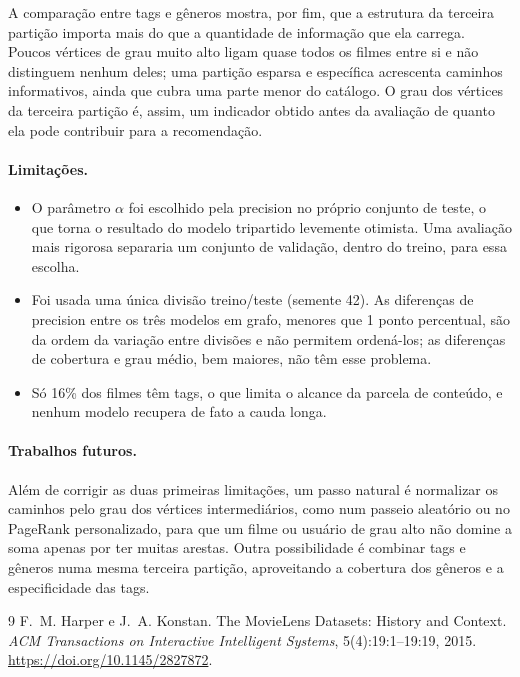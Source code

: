 \documentclass[12pt,a4paper]{article}
\theoremstyle{definition}
\begin{document}
A comparação entre tags e gêneros mostra, por fim, que a estrutura da
terceira partição importa mais do que a quantidade de informação que ela
carrega. Poucos vértices de grau muito alto ligam quase todos os filmes
entre si e não distinguem nenhum deles; uma partição esparsa e
específica acrescenta caminhos informativos, ainda que cubra uma parte
menor do catálogo. O grau dos vértices da terceira partição é, assim, um
indicador obtido antes da avaliação de quanto ela pode contribuir para a
recomendação.

\paragraph{Limitações.}
\begin{itemize}
  \item O parâmetro $\alpha$ foi escolhido pela precision no próprio
        conjunto de teste, o que torna o resultado do modelo tripartido
        levemente otimista. Uma avaliação mais rigorosa separaria um
        conjunto de validação, dentro do treino, para essa escolha.
  \item Foi usada uma única divisão treino/teste (semente 42). As
        diferenças de precision entre os três modelos em grafo, menores
        que 1 ponto percentual, são da ordem da variação entre divisões
        e não permitem ordená-los; as diferenças de cobertura e grau
        médio, bem maiores, não têm esse problema.
  \item Só 16\% dos filmes têm tags, o que limita o alcance da parcela
        de conteúdo, e nenhum modelo recupera de fato a cauda longa.
\end{itemize}

\paragraph{Trabalhos futuros.}
Além de corrigir as duas primeiras limitações, um passo natural é
normalizar os caminhos pelo grau dos vértices intermediários, como num
passeio aleatório ou no PageRank personalizado, para que um filme ou
usuário de grau alto não domine a soma apenas por ter muitas arestas.
Outra possibilidade é combinar tags e gêneros numa mesma terceira
partição, aproveitando a cobertura dos gêneros e a especificidade das
tags.


\begin{thebibliography}{9}
F.~M. Harper e J.~A. Konstan.
\newblock The MovieLens Datasets: History and Context.
\newblock \emph{ACM Transactions on Interactive Intelligent Systems},
5(4):19:1--19:19, 2015. \url{https://doi.org/10.1145/2827872}.
\end{thebibliography}
\end{document}
